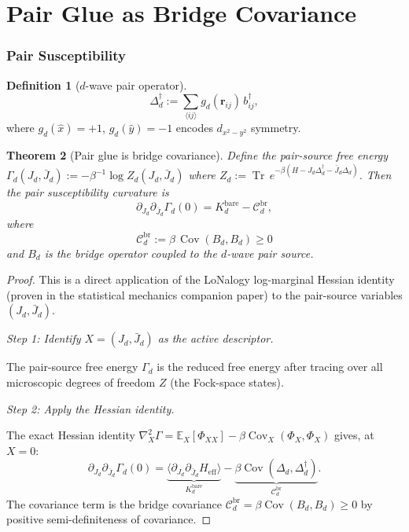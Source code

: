 \documentclass[12pt]{article}
\theoremstyle{plain}
\newtheorem{theorem}{Theorem}[section]
\theoremstyle{definition}
\newtheorem{definition}[theorem]{Definition}
\numberwithin{equation}{section}
\newcommand{\br}{\mathrm{br}}
\newcommand{\eff}{\mathrm{eff}}
\DeclareMathOperator{\Tr}{Tr}
\DeclareMathOperator{\Cov}{Cov}
\begin{document}
\part{Pair Glue as Bridge Covariance}

\section{Pair Susceptibility}\label{sec:pairsuscept}

\begin{definition}[$d$-wave pair operator]
\begin{equation}
\Delta_d^\dagger := \sum_{\langle ij\rangle}
g_d(\bm{r}_{ij})\,b_{ij}^\dagger,
\end{equation}
where $g_d(\hat{x})=+1$, $g_d(\hat{y})=-1$ encodes
$d_{x^2-y^2}$ symmetry.
\end{definition}

\begin{theorem}[Pair glue is bridge covariance]\label{thm:glue}
Define the pair-source free energy
$\Gamma_d(J_d,\bar{J}_d)
:=-\beta^{-1}\log Z_d(J_d,\bar{J}_d)$
where
$Z_d:=\Tr\,e^{-\beta(H-J_d\Delta_d^\dagger-\bar{J}_d\Delta_d)}$.
Then the pair susceptibility curvature is
\begin{equation}\label{eq:paircurv}
\boxed{\partial_{J_d}\partial_{\bar{J}_d}\Gamma_d(0)
= K_d^{\mathrm{bare}} - \mathcal{C}_d^{\br},}
\end{equation}
where
\begin{equation}\label{eq:Cdbr}
\boxed{\mathcal{C}_d^{\br}
:= \beta\,\Cov(B_d,B_d) \geq 0}
\end{equation}
and $B_d$ is the bridge operator coupled to the $d$-wave pair source.
\end{theorem}

\begin{proof}
This is a direct application of the LoNalogy log-marginal Hessian
identity (proven in the statistical mechanics companion paper) to
the pair-source variables $(J_d,\bar{J}_d)$.

\emph{Step 1: Identify $X=(J_d,\bar{J}_d)$ as the active descriptor.}

The pair-source free energy $\Gamma_d$ is the reduced free energy
after tracing over all microscopic degrees of freedom $Z$
(the Fock-space states).

\emph{Step 2: Apply the Hessian identity.}

The exact Hessian identity
$\nabla_X^2\Gamma=\mathbb{E}_X[\Phi_{XX}]-\beta\Cov_X(\Phi_X,\Phi_X)$
gives, at $X=0$:
\begin{equation}
\partial_{J_d}\partial_{\bar{J}_d}\Gamma_d(0)
= \underbrace{\langle\partial_{J_d}\partial_{\bar{J}_d}H_{\eff}\rangle}
_{K_d^{\mathrm{bare}}}
- \underbrace{\beta\Cov(\Delta_d,\Delta_d^\dagger)}
_{\mathcal{C}_d^{\br}}.
\end{equation}
The covariance term is the bridge covariance
$\mathcal{C}_d^{\br}=\beta\Cov(B_d,B_d)\geq 0$
by positive semi-definiteness of covariance.
\end{proof}
\end{document}
